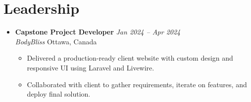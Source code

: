 \documentclass[letterpaper,10pt]{article}
\newcommand{\resumeItem}[1]{\item #1}
\newcommand{\resumeSubheading}[4]{%
  \item
  \textbf{#1} \hfill \textit{#2}\\
  \textit{#3} \hfill {#4}
}
\newcommand{\resumeSubHeadingListStart}{\begin{itemize}[leftmargin=0in,label={}]}
\newcommand{\resumeSubHeadingListEnd}{\end{itemize}}
\newcommand{\resumeItemListStart}{\begin{itemize}}
\newcommand{\resumeItemListEnd}{\end{itemize}}
\begin{document}
\section{Leadership}
\resumeSubHeadingListStart
  \resumeSubheading
    {Capstone Project Developer}{Jan 2024 -- Apr 2024}
    {BodyBliss}{Ottawa, Canada}
  \resumeItemListStart
    \resumeItem{Delivered a production-ready client website with custom design and responsive UI using Laravel and Livewire.}
    \resumeItem{Collaborated with client to gather requirements, iterate on features, and deploy final solution.}
  \resumeItemListEnd
\resumeSubHeadingListEnd
\end{document}
